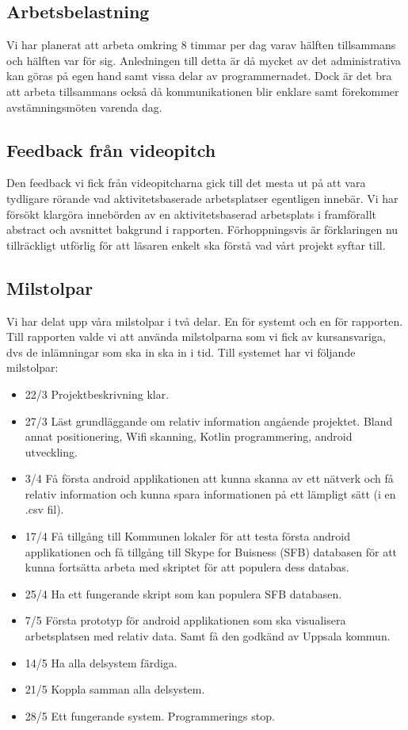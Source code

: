 \documentclass[swedish, a4paper,12pt]{article}
\begin{document}
\subsection{Arbetsbelastning}
Vi har planerat att arbeta omkring 8 timmar per dag varav hälften tillsammans och hälften var för sig. Anledningen till detta är då mycket av det administrativa kan göras på egen hand samt vissa delar av programmernadet. Dock är det bra att arbeta tillsammans också då kommunikationen blir enklare samt förekommer avstämningsmöten varenda dag.

\subsection{Feedback från videopitch}
Den feedback vi fick från videopitcharna gick till det mesta ut på att vara tydligare rörande vad aktivitetsbaserade arbetsplatser egentligen innebär.
Vi har försökt klargöra innebörden av en aktivitetsbaserad arbetsplats i framförallt abstract och avsnittet bakgrund i rapporten. Förhoppningsvis är förklaringen nu tillräckligt utförlig för att läsaren enkelt ska förstå vad vårt projekt syftar till.


\subsection{Milstolpar}
Vi har delat upp våra milstolpar i två delar. En för systemt och en för rapporten. Till rapporten valde vi att använda milstolparna som vi fick av kursansvariga, dvs de inlämningar som ska in ska in i tid. Till systemet har vi följande milstolpar:
\begin{itemize}
	\item 22/3 Projektbeskrivning klar.
	\item 27/3 Läst grundläggande om relativ information angående projektet. Bland annat positionering, Wifi skanning, Kotlin programmering, android utveckling.
	\item 3/4 Få första android applikationen att kunna skanna av ett nätverk och få relativ information och kunna spara informationen på ett lämpligt sätt (i en .csv fil).
	\item 17/4 Få tillgång till Kommunen lokaler för att testa första android applikationen och få tillgång till Skype for Buisness (SFB) databasen för att kunna fortsätta arbeta med skriptet för att populera dess databas.
 	\item 25/4 Ha ett fungerande skript som kan populera  SFB databasen.
	\item 7/5 Första prototyp för android applikationen som ska visualisera arbetsplatsen med relativ data. Samt få den godkänd av Uppsala kommun.
	\item 14/5 Ha alla delsystem färdiga.
	\item 21/5 Koppla samman alla delsystem.
	\item 28/5 Ett fungerande system. Programmerings stop.
\end{itemize}
\end{document}
